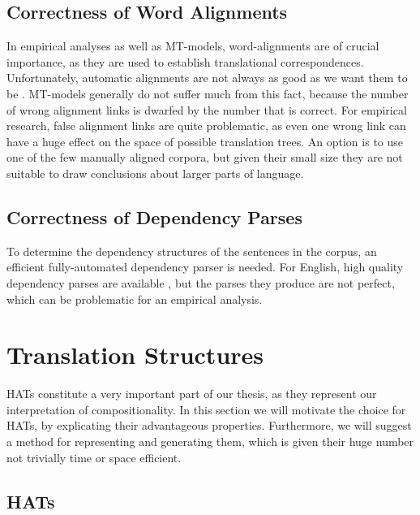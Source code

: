 \subsection{Correctness of Word Alignments}

In empirical analyses as well as MT-models, word-alignments are of crucial importance, as they are used to establish translational correspondences. Unfortunately, automatic alignments are not always as good as we want them to be \citep[see][for concrete numbers]{och2000improved}. MT-models generally do not suffer much from this fact, because the number of wrong alignment links is dwarfed by the number that is correct. For empirical research, false alignment links are quite problematic, as even one wrong link can have a huge effect on the space of possible translation trees. An option is to use one of the few manually aligned corpora, but given their small size they are not suitable to draw conclusions about larger parts of language.

\subsection{Correctness of Dependency Parses}

To determine the dependency structures of the sentences in the corpus, an efficient fully-automated dependency parser is needed.  For English, high quality dependency parses are available \citep{cer2010parsing}, but the parses they produce are not perfect, which can be problematic for an empirical analysis.



\section{Translation Structures}
\label{sec:comp_structures2}

HATs constitute a very important part of our thesis, as they represent our interpretation of compositionality. In this section we will motivate the choice for HATs, by explicating their advantageous properties. Furthermore, we will suggest a method for representing and generating them, which is given their huge number not trivially time or space efficient.

\subsection{HATs}

